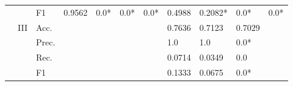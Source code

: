 \begin{tabular}{cclllllllll}
                                                                                                               &                                   & F1                                                   & 0.9562                  & 0.0*                    & 0.0*                         & 0.0*                    & 0.4988                                                                       & 0.2082*                                                                     & 0.0*                                      & 0.0*                                      \\ 
    \cmidrule{2-11}
                                                                                                               & \multirow{4}{*}{III}              & Acc.                                                 &                         &                         &                              &                         & 0.7636                                                                       & 0.7123                                                                      & 0.7029                                    &                                           \\
                                                                                                               &                                   & Prec.                                                &                         &                         &                              &                         & 1.0                                                                          & 1.0                                                                         & 0.0*                                      &                                           \\
                                                                                                               &                                   & Rec.                                                 &                         &                         &                              &                         & 0.0714                                                                       & 0.0349                                                                      & 0.0                                       &                                           \\
                                                                                                               &                                   & F1                                                   &                         &                         &                              &                         & 0.1333                                                                       & 0.0675                                                                      & 0.0*                                      &                                           \\
    \bottomrule
    \end{tabular}